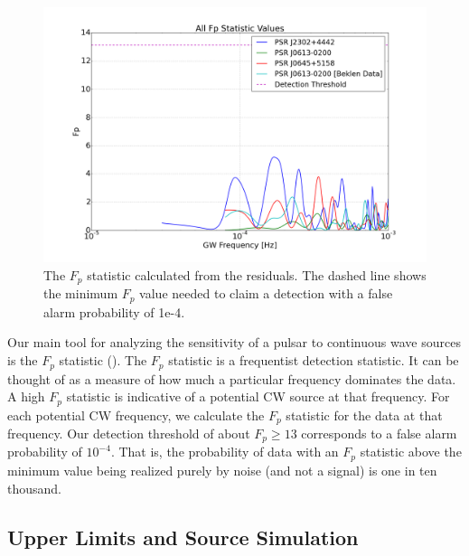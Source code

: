 \documentclass[12pt]{article}
\begin{document}
\begin{figure}[h!]
\caption{The $F_p$ statistic calculated from the residuals. The dashed line shows
    the minimum $F_p$ value needed to claim a detection with a false alarm probability
    of 1e-4.}
\includegraphics[width=\textwidth]{./figures/both_fp_presentation.png}
\end{figure}

    Our main tool for analyzing the sensitivity of a pulsar to continuous wave
sources is the $F_p$ statistic (\cite{Arz2014}). The
$F_p$ statistic is a frequentist detection statistic. It can be thought of as a
measure of how much a particular frequency dominates the data. A high $F_p$
statistic is indicative of a potential CW source at that frequency. For each
potential CW frequency, we calculate the $F_p$ statistic for the data at that
frequency. Our detection threshold of about $F_p \geq 13$ corresponds to a false
alarm probability of $10^{-4}$. That is, the probability of data with an $F_p$
statistic above the minimum value being realized purely by noise (and not a
signal) is one in ten thousand.

\subsection{Upper Limits and Source Simulation}
\end{document}
